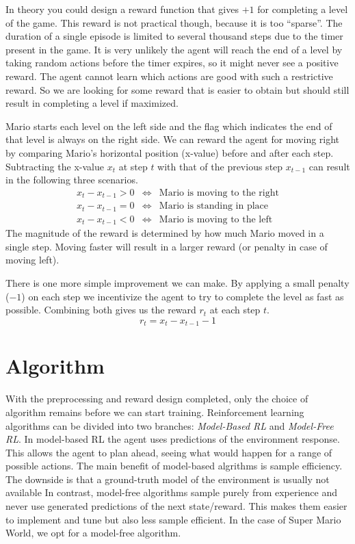 \documentclass[11pt,a4paper]{article}
\begin{document}
In theory you could design a reward function that gives $+1$ for completing a level of the game.
This reward is not practical though, because it is too ``sparse''.
The duration of a single episode is limited to several thousand steps due to the timer present in the game.
It is very unlikely the agent will reach the end of a level by taking random actions before the timer expires, so it might never see a positive reward.
The agent cannot learn which actions are good with such a restrictive reward.
So we are looking for some reward that is easier to obtain but should still result in completing a level if maximized.

Mario starts each level on the left side and the flag which indicates the end of that level is always on the right side.
We can reward the agent for moving right by comparing Mario's horizontal position (x-value) before and after each step.
Subtracting the x-value $x_{t}$ at step $t$ with that of the previous step $x_{t-1}$ can result in the following three scenarios.
\begin{eqnarray*}
    x_{t} - x_{t-1} > 0&\iff&\text{Mario is moving to the right}\\
    x_{t} - x_{t-1} = 0&\iff&\text{Mario is standing in place}\\
    x_{t} - x_{t-1} < 0&\iff&\text{Mario is moving to the left}
\end{eqnarray*}
The magnitude of the reward is determined by how much Mario moved in a single step.
Moving faster will result in a larger reward (or penalty in case of moving left).

There is one more simple improvement we can make.
By applying a small penalty ($-1$) on each step we incentivize the agent to try to complete the level as fast as possible.
Combining both gives us the reward $r_{t}$ at each step $t$.
\[r_{t} = x_{t} - x_{t-1} - 1\]


\section{Algorithm}
With the preprocessing and reward design completed, only the choice of algorithm remains before we can start training.
Reinforcement learning algorithms can be divided into two branches: \emph{Model-Based RL} and \emph{Model-Free RL}.
In model-based RL the agent uses predictions of the environment response.
This allows the agent to plan ahead, seeing what would happen for a range of possible actions.
The main benefit of model-based algrithms is sample efficiency.
The downside is that a ground-truth model of the environment is usually not available
In contrast, model-free algorithms sample purely from experience and never use generated predictions of the next state/reward.
This makes them easier to implement and tune but also less sample efficient.
In the case of Super Mario World, we opt for a model-free algorithm.
\end{document}
